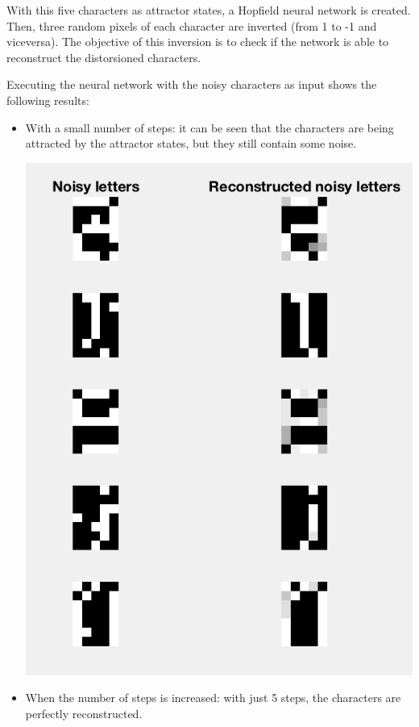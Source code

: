 \documentclass[10pt]{article}
\begin{document}
\begin{multicols}{2}
  With this five characters as attractor states, a Hopfield neural
  network is created. Then, three random pixels of each character
  are inverted (from 1 to -1 and viceversa). The objective of this
  inversion is to check if the network is able to reconstruct the
  distorsioned characters.

  Executing the neural network with the noisy characters as input
  shows the following results:

  \begin{itemize}
  \item With a small number of steps: it can be seen that the
    characters are being attracted by the attractor states, but they still
    contain some noise.
    \begin{center}
      \includegraphics[height=\linewidth]{img/recons1}
    \end{center}
  \item When the number of steps is increased: with just 5 steps, the
    characters are perfectly reconstructed.
    \begin{center}

\end{center}
\end{itemize}
\end{multicols}
\end{document}
